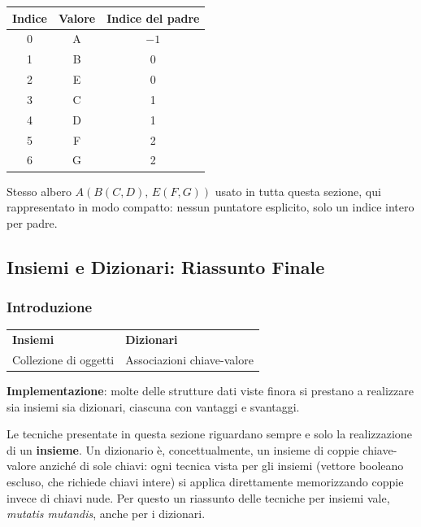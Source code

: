 \documentclass[12pt, a4paper]{article}
\begin{document}
\begin{center}
\begin{tabular}{c|cc}
\toprule
\textbf{Indice} & \textbf{Valore} & \textbf{Indice del padre} \\
\midrule
0 & A & $-1$ \\
1 & B & 0 \\
2 & E & 0 \\
3 & C & 1 \\
4 & D & 1 \\
5 & F & 2 \\
6 & G & 2 \\
\bottomrule
\end{tabular}
\end{center}
Stesso albero $A(B(C,D),\,E(F,G))$ usato in tutta questa sezione, qui rappresentato in modo compatto: nessun puntatore esplicito, solo un indice intero per padre.


\subsection{Insiemi e Dizionari: Riassunto Finale}
\label{sec:insiemi-dizionari}

\subsubsection{Introduzione}

\begin{center}
\begin{tabular}{ll}
\textbf{Insiemi} & \textbf{Dizionari} \\
Collezione di oggetti & Associazioni chiave-valore \\
\end{tabular}
\end{center}

\textbf{Implementazione}: molte delle strutture dati viste finora si prestano a realizzare sia insiemi sia dizionari, ciascuna con vantaggi e svantaggi.

\begin{tcolorbox}[colback=lightergray!5, colframe=tocsubsec, title=\textbf{Nota mia (non nella slide): perché non si parla mai di ``dizionario'' nel seguito?}]
Le tecniche presentate in questa sezione riguardano sempre e solo la realizzazione di un \textbf{insieme}. Un dizionario è, concettualmente, un insieme di coppie chiave-valore anziché di sole chiavi: ogni tecnica vista per gli insiemi (vettore booleano escluso, che richiede chiavi intere) si applica direttamente memorizzando coppie invece di chiavi nude. Per questo un riassunto delle tecniche per insiemi vale, \emph{mutatis mutandis}, anche per i dizionari.
\end{tcolorbox}
\end{document}
